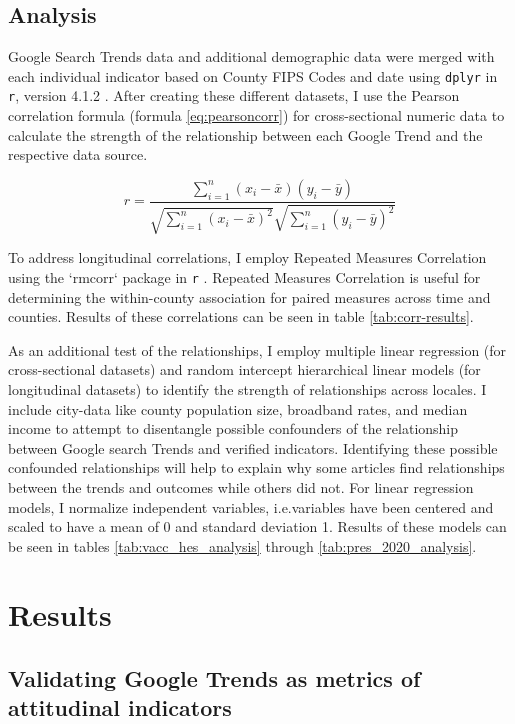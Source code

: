 \subsection{Analysis}
Google Search Trends data and additional demographic data were merged with each
individual indicator based on County FIPS Codes and date using \texttt{dplyr} in \texttt{r}, version 4.1.2 \citep{tidyverse}. After creating these
different datasets, I use the Pearson correlation formula (formula \eqref{eq:pearsoncorr}) for cross-sectional numeric data to calculate the
strength of the relationship between each Google Trend and the respective
data source.

\begin{equation}
 r =
  \frac{ \sum_{i=1}^{n}(x_i-\bar{x})(y_i-\bar{y}) }{
        \sqrt{\sum_{i=1}^{n}(x_i-\bar{x})^2}\sqrt{\sum_{i=1}^{n}(y_i-\bar{y})^2}} \label{eq:pearsoncorr}
\end{equation}

To address longitudinal correlations, I employ Repeated Measures Correlation
using the `rmcorr` package in \texttt{r} \citep{bland1995, bakdash2017}. 
Repeated Measures Correlation is useful for determining the within-county
association for paired measures across time and counties. Results of these 
correlations can be seen in table \ref{tab:corr-results}.

As an additional test of the relationships, I employ multiple linear regression
(for cross-sectional datasets) and random intercept hierarchical linear models
\citep{pinheiro_etal21} (for longitudinal datasets) to identify the strength of
relationships across locales. I include city-data like county population size,
broadband rates, and median income to attempt to disentangle possible
confounders of the relationship between Google search Trends and verified
indicators. Identifying these possible confounded relationships will help to
explain why some articles find relationships between the trends and outcomes
while others did not. For linear regression models, I normalize independent
variables, i.e.variables have been centered and scaled to have a mean of 0 and
standard deviation 1. Results of these models can be seen in tables \ref{tab:vacc_hes_analysis} through \ref{tab:pres_2020_analysis}.

\section{Results}

\subsection{Validating Google Trends as metrics of attitudinal indicators}

